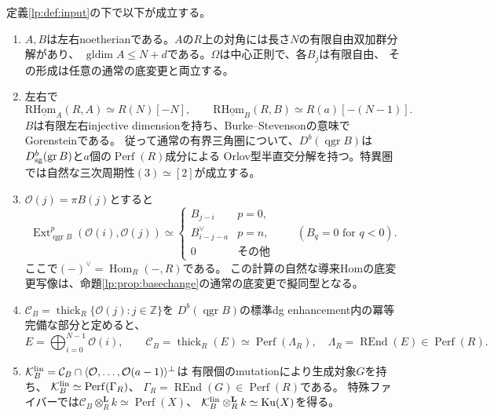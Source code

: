 \begin{theorem}[局所proper模型と有界Orlov分解]\label{lp:thm:main}
定義\ref{lp:def:input}の下で以下が成立する。
\begin{enumerate}[label=(\arabic*)]
\item $A,B$は左右noetherianである。$A$の$R$上の対角には長さ$N$の有限自由双加群分解があり、
$\operatorname{gldim}A\le N+d$である。$\Omega$は中心正則で、各$B_j$は有限自由、
その形成は任意の通常の底変更と両立する。
\item 左右で
\[
 \operatorname{R\underline{Hom}}_A(R,A)\simeq R(N)[-N],\qquad
 \operatorname{R\underline{Hom}}_B(R,B)\simeq R(a)[-(N-1)].
 \tag{G}\label{lp:eq:G}
\]
$B$は有限左右injective dimensionを持ち、Burke--Stevensonの意味でGorensteinである。
従って通常の有界三角圏について、$D^b(\operatorname{qgr}B)$は
$D_{\rm sg}^b(\operatorname{gr}B)$と$a$個の$\operatorname{Perf}(R)$成分による
Orlov型半直交分解を持つ。特異圏では自然な三次周期性$(3)\simeq[2]$が成立する。
\item $\mathcal O(j)=\pi B(j)$とすると
\[
 \operatorname{Ext}^p_{\operatorname{qgr}B}(\mathcal O(i),\mathcal O(j))\simeq
 \begin{cases}
 B_{j-i}&p=0,\\
 B_{i-j-a}^{\vee}&p=n,\\
 0&\text{その他}
 \end{cases}\qquad (B_q=0\text{ for }q<0).
 \tag{H}\label{lp:eq:H}
\]
ここで$(-)^\vee=\operatorname{Hom}_R(-,R)$である。
この計算の自然な導来Homの底変更写像は、命題\ref{lp:prop:basechange}の通常の底変更で擬同型となる。
\item $\mathcal C_B=\operatorname{thick}_R\{\mathcal O(j):j\in\mathbb Z\}$を
$D^b(\operatorname{qgr}B)$の標準dg enhancement内の冪等完備な部分と定めると、
\[
 E=\bigoplus_{i=0}^{N-1}\mathcal O(i),\qquad
 \mathcal C_B=\operatorname{thick}_R(E)\simeq\operatorname{Perf}(\Lambda_R),
 \quad\Lambda_R=\operatorname{REnd}(E)\in\operatorname{Perf}(R).
 \tag{P}\label{lp:eq:proper-model}
\]
\item $\mathcal K_B^{\rm lin}=\mathcal C_B\cap
\langle\mathcal O,\ldots,\mathcal O(a-1)\rangle^\perp$は
有限個のmutationにより生成対象$G$を持ち、
$\mathcal K_B^{\rm lin}\simeq\operatorname{Perf}(\Gamma_R)$、
$\Gamma_R=\operatorname{REnd}(G)\in\operatorname{Perf}(R)$である。
特殊ファイバーでは$\mathcal C_B\otimes_R^{\mathbf L}k\simeq\operatorname{Perf}(X)$、
$\mathcal K_B^{\rm lin}\otimes_R^{\mathbf L}k\simeq\operatorname{Ku}(X)$を得る。
\end{enumerate}
\end{theorem}

